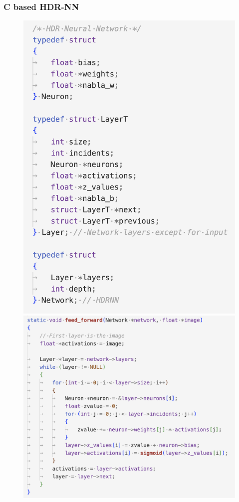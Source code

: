 \documentclass{beamer}
\begin{document}
\begin{frame}
  \frametitle{C based HDR-NN}

  \begin{figure}
    \centering
    \includegraphics[scale=0.30]{images/c-hdrnn.png}
    \includegraphics[scale=0.27]{images/c-ff.png}
  \end{figure}

\end{frame}
\end{document}
